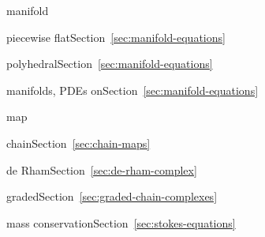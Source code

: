 \par\noindent\hspace*{0em}\label{index:manifold}{manifold}

\par\noindent\hspace*{1em}\label{index:manifold-piecewise-flat}{piecewise flat}\quad Section~\ref{sec:manifold-equations}

\par\noindent\hspace*{1em}\label{index:manifold-polyhedral}{polyhedral}\quad Section~\ref{sec:manifold-equations}

\par\noindent\hspace*{0em}\label{index:manifolds-pdes-on}{manifolds, PDEs on}\quad Section~\ref{sec:manifold-equations}

\par\noindent\hspace*{0em}\label{index:map}{map}

\par\noindent\hspace*{1em}\label{index:map-chain}{chain}\quad Section~\ref{sec:chain-maps}

\par\noindent\hspace*{1em}\label{index:map-de-rham}{de Rham}\quad Section~\ref{sec:de-rham-complex}

\par\noindent\hspace*{1em}\label{index:map-graded}{graded}\quad Section~\ref{sec:graded-chain-complexes}

\par\noindent\hspace*{0em}\label{index:mass-conservation}{mass conservation}\quad Section~\ref{sec:stokes-equations}


